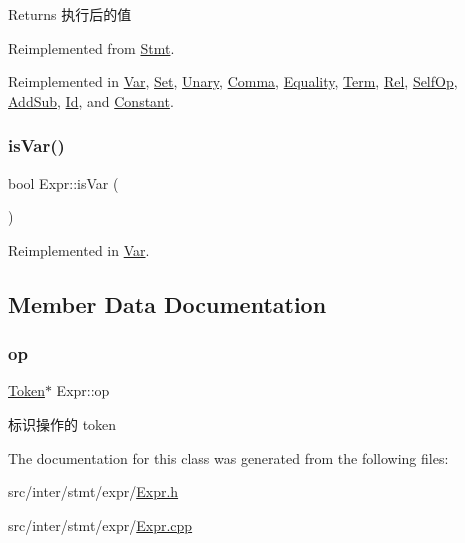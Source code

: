 \begin{DoxyReturn}{Returns}
执行后的值 
\end{DoxyReturn}


Reimplemented from \hyperlink{class_stmt_abdc3261770c3c5bd3ce5b3ba6eedfaa4}{Stmt}.



Reimplemented in \hyperlink{class_var_a9dc96e803f7b0f9aa519c2c0e0a6bd8f}{Var}, \hyperlink{class_set_a7776ba36f3af8b09772b36927beb5f5c}{Set}, \hyperlink{class_unary_af42edff1ee4718a9afeb7127e41af758}{Unary}, \hyperlink{class_comma_aab9ca2bb70a10abd2fb263de745f843a}{Comma}, \hyperlink{class_equality_a0255c33af70613b006b03a329ed329ff}{Equality}, \hyperlink{class_term_ac2d20115da73f9425e5d390856a211a1}{Term}, \hyperlink{class_rel_a82b2f3b75a2b9e81631f2659d42a36d1}{Rel}, \hyperlink{class_self_op_ab452bcad1cd4f1286813b1f737583818}{Self\+Op}, \hyperlink{class_add_sub_a73c0513a31a5400fdfc79ce877a1c3b9}{Add\+Sub}, \hyperlink{class_id_ae43a9ffecbbc0ac4fd041b8e8e3c3de0}{Id}, and \hyperlink{class_constant_ab5c55607bcff5ce70131a588b6bdbed7}{Constant}.

\mbox{\label{class_expr_add2b30644dd850c4bfa2d619d20d8c09}} 
\subsubsection{\texorpdfstring{is\+Var()}{isVar()}}
{\footnotesize\ttfamily bool Expr\+::is\+Var (\begin{DoxyParamCaption}{ }\end{DoxyParamCaption})\hspace{0.3cm}{\ttfamily [virtual]}}



Reimplemented in \hyperlink{class_var_a50aa6f54310903a8bc36184813a2b9ef}{Var}.



\subsection{Member Data Documentation}
\mbox{\label{class_expr_a5fd7721b7843686e3ec7e63fddf95644}} 
\subsubsection{\texorpdfstring{op}{op}}
{\footnotesize\ttfamily \hyperlink{class_token}{Token}$\ast$ Expr\+::op}

标识操作的 token 

The documentation for this class was generated from the following files\+:\begin{DoxyCompactItemize}
\item 
src/inter/stmt/expr/\hyperlink{_expr_8h}{Expr.\+h}\item 
src/inter/stmt/expr/\hyperlink{_expr_8cpp}{Expr.\+cpp}\end{DoxyCompactItemize}
